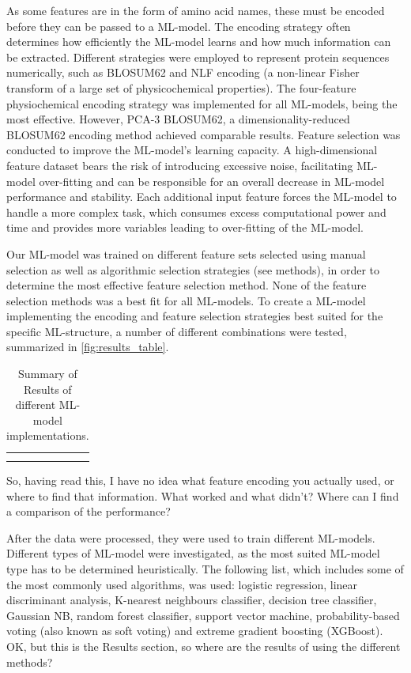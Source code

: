 \documentclass[12pt]{article}
\newcommand{\lilian}[1]{ {\color{red}{\bfseries Lilian:} #1}}
\begin{document}
As some features are in the form of amino acid names, these must be
encoded before they can be passed to a ML-model. The
encoding strategy often determines how efficiently the ML-model learns
and how much information can be extracted. Different strategies were
employed to represent protein sequences numerically, such as BLOSUM62\cite{Henikoff1992} and NLF\cite{Nanni2011} encoding (a non-linear Fisher transform of a large set of physicochemical properties). The four-feature physiochemical encoding strategy\cite{Abhinandan2010} was implemented for all ML-models, being
the most effective. However, PCA-3 BLOSUM62, a dimensionality-reduced
BLOSUM62 encoding method achieved comparable results.
Feature selection was conducted to improve the ML-model's learning
capacity. A high-dimensional feature dataset bears the risk of
introducing excessive noise, facilitating ML-model over-fitting and can be
responsible for an overall decrease in ML-model performance and
stability. Each additional input feature forces the ML-model to
handle a more complex task, which consumes excess computational power
and time and provides more variables leading to over-fitting of the ML-model.

Our ML-model was trained on different feature sets selected using manual
selection as well as algorithmic selection strategies (see methods), in order to
determine the most effective feature selection method. None of the
feature selection methods was a best fit for all ML-models. To create a ML-model implementing the encoding and feature selection strategies best suited for the specific ML-structure, a number of different combinations were tested, summarized in \ref{fig:results_table}.
\begin{table}[results_table]
    \centering
    \begin{tabular}{c|c}
         &  \\
         & 
    \end{tabular}
    \caption{Summary of Results of different ML-model implementations.}
    \label{tab:my_label}
\end{table}

\lilian{So, having read this, I have no idea what feature encoding you
  actually used, or where to find that information. What worked and
  what didn't? Where can I find a comparison of the performance?}

After the data were processed, they were used to train different
ML-models. Different types of ML-model were investigated, as the most
suited ML-model type has to be determined heuristically. 
The following list, which includes some of the most commonly used
algorithms, was used: logistic regression, linear discriminant analysis,
K-nearest neighbours classifier, decision tree classifier, Gaussian
NB, random forest classifier, support vector machine,
probability-based voting (also known as soft voting) and extreme
gradient boosting (XGBoost)\cite{Chen2016}.
\lilian{OK, but this is the Results section, so where are the results
  of using the different methods?}
\end{document}
